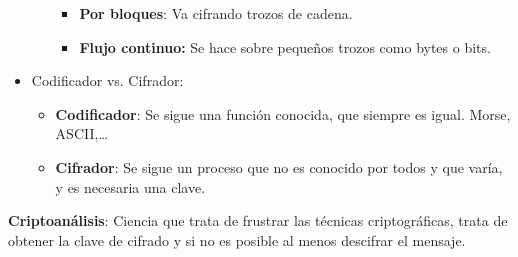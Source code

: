\documentclass[12pt, twoside, openright]{report} %
\begin{document}
\begin{itemize}
\begin{itemize}
      \begin{itemize}
      \item \textbf{Por bloques}: Va cifrando trozos de cadena.
        
      \item \textbf{Flujo continuo:} Se hace sobre pequeños trozos como
        bytes o bits.
        
      \end{itemize}
    \end{itemize}
	\pagebreak
  \item Codificador vs. Cifrador:
    
    \begin{itemize}
    \item \textbf{Codificador}: Se sigue una función conocida, que siempre
      es igual. Morse, ASCII,\ldots{}
      
    \item \textbf{Cifrador}: Se sigue un proceso que no es conocido por
      todos y que varía, y es necesaria una clave.
      
    \end{itemize}
  \end{itemize}

  
  \textbf{Criptoanálisis}: Ciencia que trata de frustrar las técnicas
  criptográficas, trata de obtener la clave de cifrado y si no es
  posible al menos descifrar el mensaje.
  
\end{document}
